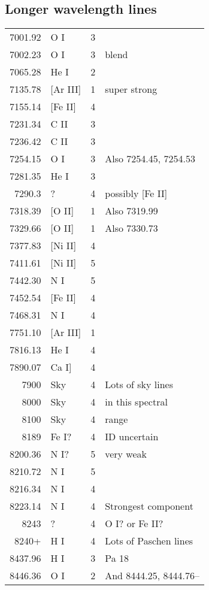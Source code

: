 \documentclass[11pt]{article}
\begin{document}
\subsection{Longer wavelength lines}
\label{sec:orgheadline8}
\begin{center}
\begin{tabular}{rlrl}
7001.92 & O I & 3 & \\
7002.23 & O I & 3 & blend\\
7065.28 & He I & 2 & \\
7135.78 & [Ar III] & 1 & super strong\\
7155.14 & [Fe II] & 4 & \\
7231.34 & C II & 3 & \\
7236.42 & C II & 3 & \\
7254.15 & O I & 3 & Also 7254.45, 7254.53\\
7281.35 & He I & 3 & \\
7290.3 & ? & 4 & possibly [Fe II]\\
7318.39 & [O II] & 1 & Also 7319.99\\
7329.66 & [O II] & 1 & Also 7330.73\\
7377.83 & [Ni II] & 4 & \\
7411.61 & [Ni II] & 5 & \\
7442.30 & N I & 5 & \\
7452.54 & [Fe II] & 4 & \\
7468.31 & N I & 4 & \\
\hline
7751.10 & [Ar III] & 1 & \\
7816.13 & He I & 4 & \\
7890.07 & Ca I] & 4 & \\
7900 & Sky & 4 & Lots of sky lines\\
8000 & Sky & 4 & in this spectral\\
8100 & Sky & 4 & range\\
\hline
8189 & Fe I? & 4 & ID uncertain\\
8200.36 & N I? & 5 & very weak\\
8210.72 & N I & 5 & \\
8216.34 & N I & 4 & \\
8223.14 & N I & 4 & Strongest component\\
8243 & ? & 4 & O I? or Fe II?\\
8240+ & H I & 4 & Lots of Paschen lines\\
8437.96 & H I & 3 & Pa 18\\
8446.36 & O I & 2 & And 8444.25, 8444.76--\\

\end{tabular}
\end{center}
\end{document}
